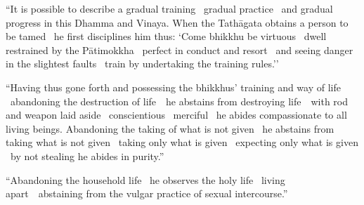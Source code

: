 \else

\begin{english-only-justify}
  ``It is possible to describe a gradual training \breathmark\ gradual practice \breathmark\ and gradual progress in this Dhamma and Vinaya. When the Tathāgata obtains a person to be tamed \breathmark\ he first disciplines him thus: `Come bhikkhu be virtuous \breathmark\ dwell restrained by the Pātimokkha \breathmark\ perfect in conduct and resort \breathmark\ and seeing danger in the slightest faults \breathmark\ train by undertaking the training rules.''
\end{english-only-justify}

\fi

\suttaRef{[MN 107]}

\begin{english-only-justify}
  ``Having thus gone forth and possessing the bhikkhus' training and way of life \breathmark\ abandoning the destruction of \mbox{life}~\breathmark\ he abstains from destroying \mbox{life}~\breathmark\ with rod and weapon laid aside \breathmark\ conscientious \breathmark\ merciful \breathmark\ he abides compassionate to all living beings. Abandoning the taking of what is not given \breathmark\ he abstains from taking what is not given \breathmark\ taking only what is given \breathmark\ expecting only what is given \breathmark\ by not stealing he abides in purity.''
\end{english-only-justify}

\begin{english-only-justify}
  ``Abandoning the household life \breathmark\ he observes the holy life \breathmark\ living \mbox{apart}~\breathmark\ abstaining from the vulgar practice of sexual intercourse.''
\end{english-only-justify}

